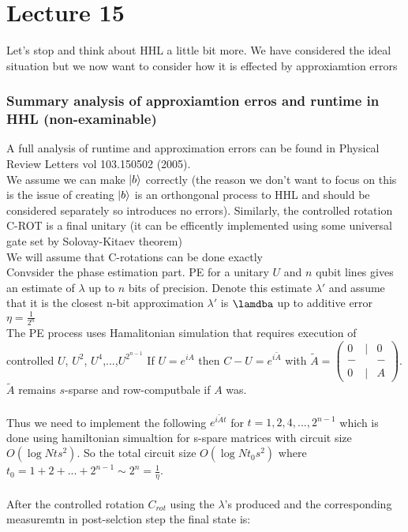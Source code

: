 \documentclass{article}
\begin{document}
 \section{Lecture 15}
 Let's stop and think about HHL a little bit more. We have considered the ideal situation but we now want to consider how it is effected by approxiamtion errors
 \subsubsection{Summary analysis of approxiamtion erros and runtime in HHL (non-examinable)}
 A full analysis of runtime and approximation errors can be found in Physical Review Letters vol 103.150502 (2005).\\
 We assume we can make $\ket{b}$ correctly (the reason we don't want to focus on this is the issue of creating $\ket{b}$ is an orthongonal process to HHL and should be considered separately so introduces no errors). Similarly, the controlled rotation C-ROT is a final unitary (it can be efficently implemented using some universal gate set by Solovay-Kitaev theorem)\\
 We will assume that C-rotations can be done exactly\\
 Convsider the phase estimation part. PE for a unitary $U$ and $n$ qubit lines gives an estimate of $\lambda$ up to $n$ bits of precision. Denote this estimate $\lambda'$ and assume that it is the closest n-bit approximation $\lambda'$ is $\lamdba$ up to additive error $\eta = \frac{1}{2^n}$\\
                       The PE process uses Hamalitonian simulation that requires execution of controlled $U$, $U^2$, $U^4$,...,$U^{2^{n-1}}$ If $U = e^{iA}$ then $C-U = e^{i \tilde A}$ with $\tilde A = \begin{pmatrix} 0 &|& 0 \\ -& & - \\ 0 & |& A \end{pmatrix}$. $\tilde A$ remains $s$-sparse and row-computbale if $A$ was. \\\\
                       Thus we need to implement the following $e^{i \tilde A t}$ for $t = 1,2,4,..., 2^{n-1}$ which is done using hamiltonian simualtion for s-spare matrices with circuit size $O(\log N t s^2)$. So the total circuit size $O(\log N t_0 s^2)$ where $t_0 = 1 + 2 + ... + 2^{n-1} \sim 2^n = \frac{1}{\eta}$. \\\\
                       After the controlled rotation $C_{rot}$ using the $\lambda$'s produced and the corresponding measuremtn in post-selction step the final state is:
\end{document}
